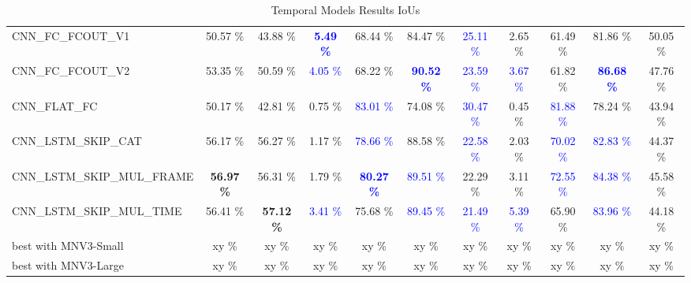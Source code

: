 \begin{table}[H]
{\begin{tabular}{lcccccccccc}
        \rowcolor[gray]{0.9} CNN\_FC\_FCOUT\_V1           & 50.57 \%          & 43.88 \%          & \textcolor{blue}{\textbf{5.49 \%}} & 68.44 \%                            & 84.47 \%                            & \textcolor{blue}{25.11 \%}          & 2.65 \%                            & 61.49 \%                            & 81.86 \%                            & 50.05 \% \\ 
        \rowcolor{white}     CNN\_FC\_FCOUT\_V2           & 53.35 \%          & 50.59 \%          & \textcolor{blue}{4.05 \%}          & 68.22 \%                            & \textcolor{blue}{\textbf{90.52 \%}} & \textcolor{blue}{23.59 \%}          & \textcolor{blue}{3.67 \%}          & 61.82 \%                            & \textcolor{blue}{\textbf{86.68 \%}} & 47.76 \% \\ 
        \rowcolor[gray]{0.9} CNN\_FLAT\_FC                & 50.17 \%          & 42.81 \%          & 0.75 \%                            & \textcolor{blue}{83.01 \%}          & 74.08 \%                            & \textcolor{blue}{30.47 \%}          & 0.45 \%                            & \textcolor{blue}{81.88 \%}          & 78.24 \%                            & 43.94 \% \\ 
        \rowcolor{white}     CNN\_LSTM\_SKIP\_CAT         & 56.17 \%          & 56.27 \%          & 1.17 \%                            & \textcolor{blue}{78.66 \%}          & 88.58 \%                            & \textcolor{blue}{22.58 \%}          & 2.03 \%                            & \textcolor{blue}{70.02 \%}          & \textcolor{blue}{82.83 \%}          & 44.37 \% \\ 
        \rowcolor[gray]{0.9} CNN\_LSTM\_SKIP\_MUL\_FRAME  & \textbf{56.97 \%} & 56.31 \%          & 1.79 \%                            & \textcolor{blue}{\textbf{80.27 \%}} & \textcolor{blue}{89.51 \%}          & 22.29 \%                            & 3.11 \%                            & \textcolor{blue}{72.55 \%}          & \textcolor{blue}{84.38 \%}          & 45.58 \% \\ 
        \rowcolor{white}     CNN\_LSTM\_SKIP\_MUL\_TIME   & 56.41 \%          & \textbf{57.12 \%} & \textcolor{blue}{3.41 \%}          & 75.68 \%  	                         & \textcolor{blue}{89.45 \%}          & \textcolor{blue}{21.49 \%}          & \textcolor{blue}{5.39 \%}          & 65.90 \%                            & \textcolor{blue}{83.96 \%}          & 44.18 \% \\ 
        \hline
        \rowcolor[gray]{0.9} best with MNV3-Small & xy \% & xy \% & xy \% & xy \% & xy \% & xy \% & xy \% & xy \% & xy \% & xy \% \\
        \rowcolor{white}     best with MNV3-Large & xy \% & xy \% & xy \% & xy \% & xy \% & xy \% & xy \% & xy \% & xy \% & xy \% \\
        \hline
    \end{tabular}
    }
    \caption{Temporal Models Results IoUs}
    \label{tab:temporalModelsResultsIoUs_old}
\end{table}

